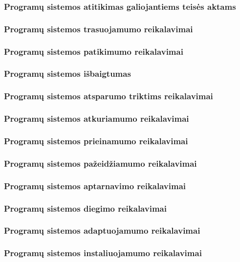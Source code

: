 \documentclass{VUMIFPSkursinis}
\begin{document}
	\subsubsection{Programų sistemos atitikimas galiojantiems teisės aktams}
	\subsubsection{Programų sistemos trasuojamumo reikalavimai}
	\subsubsection{Programų sistemos patikimumo reikalavimai}
	\subsubsection{Programų sistemos išbaigtumas}
	\subsubsection{Programų sistemos atsparumo triktims reikalavimai}
	\subsubsection{Programų sistemos atkuriamumo reikalavimai}
	\subsubsection{Programų sistemos prieinamumo reikalavimai}
	\subsubsection{Programų sistemos pažeidžiamumo reikalavimai}
	\subsubsection{Programų sistemos aptarnavimo reikalavimai}
	\subsubsection{Programų sistemos diegimo reikalavimai}
	\subsubsection{Programų sistemos adaptuojamumo reikalavimai}
	\subsubsection{Programų sistemos instaliuojamumo reikalavimai}
\end{document}
